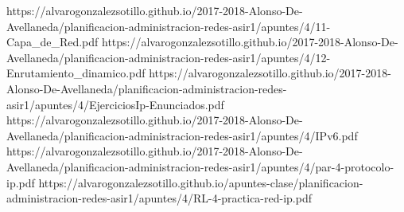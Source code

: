 https://alvarogonzalezsotillo.github.io/2017-2018-Alonso-De-Avellaneda/planificacion-administracion-redes-asir1/apuntes/4/11-Capa_de_Red.pdf
https://alvarogonzalezsotillo.github.io/2017-2018-Alonso-De-Avellaneda/planificacion-administracion-redes-asir1/apuntes/4/12-Enrutamiento_dinamico.pdf
https://alvarogonzalezsotillo.github.io/2017-2018-Alonso-De-Avellaneda/planificacion-administracion-redes-asir1/apuntes/4/EjerciciosIp-Enunciados.pdf
https://alvarogonzalezsotillo.github.io/2017-2018-Alonso-De-Avellaneda/planificacion-administracion-redes-asir1/apuntes/4/IPv6.pdf
https://alvarogonzalezsotillo.github.io/2017-2018-Alonso-De-Avellaneda/planificacion-administracion-redes-asir1/apuntes/4/par-4-protocolo-ip.pdf
https://alvarogonzalezsotillo.github.io/apuntes-clase/planificacion-administracion-redes-asir1/apuntes/4/RL-4-practica-red-ip.pdf
